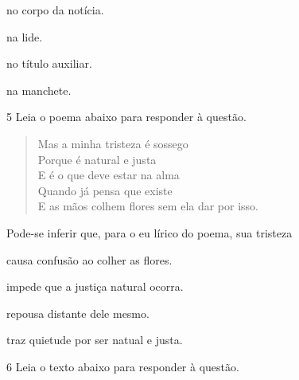 \begin{multicols}{2}
\begin{escolha}
  
  \item no corpo da notícia.
  
  \item na lide.
  
  \item no título auxiliar.
  
  \item na manchete.

\end{escolha}
\end{multicols}

\num{5} Leia o poema abaixo para responder à questão. 

\begin{myquote}
\begin{verse}

Mas a minha tristeza é sossego \\
Porque é natural e justa \\
E é o que deve estar na alma \\
Quando já pensa que existe \\
E as mãos colhem flores sem ela dar por isso.

\end{verse}


\end{myquote}

Pode-se inferir que, para o eu lírico do poema, sua tristeza

\begin{escolha}

    \item causa confusão ao colher as flores.

    \item impede que a justiça natural ocorra.

    \item repousa distante dele mesmo. 

    \item traz quietude por ser natual e justa. 

\end{escolha}

\num{6} Leia o texto abaixo para responder à questão. 

